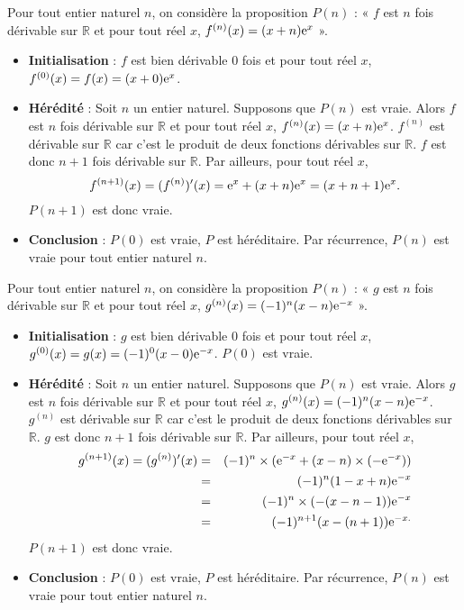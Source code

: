 \documentclass[11pt,fleqn, openany]{book} %
\begin{document}
\begin{solution}Pour tout entier naturel \(n\), on considère la proposition \(P(n)\) : « \(f\) est \(n\) fois dérivable sur \(\mathbb{R}\) et pour tout réel \(x\), \(f^{(n)}(x)=(x+n)\mathrm{e}^x\) ».
\begin{itemize}
\item \textbf{Initialisation} : \(f\) est bien dérivable 0 fois et pour tout réel \(x\), \(f^{(0)}(x)=f(x)=(x+0)\mathrm{e}^x\).
\item\textbf{ Hérédité} : Soit \(n\) un entier naturel. Supposons que \(P(n)\) est vraie. Alors \(f\) est \(n\) fois dérivable sur \(\mathbb{R}\) et pour tout réel \(x\), \(f^{(n)}(x)=(x+n)\mathrm{e}^x\). \(f^{(n)}\) est dérivable sur \(\mathbb{R}\) car c'est le produit de deux fonctions dérivables sur \(\mathbb{R}\). \(f\) est donc \(n+1\) fois dérivable sur \(\mathbb{R}\). Par ailleurs, pour tout réel \(x\),
\[f^{(n+1)}(x) = (f^{(n)})'(x)=\mathrm{e}^x+(x+n)\mathrm{e}^x=(x+n+1)\mathrm{e}^x.\]
\(P(n+1)\) est donc vraie.
\item \textbf{Conclusion} : \(P(0)\) est vraie, \(P\) est héréditaire. Par récurrence, \(P(n)\) est vraie pour tout entier naturel \(n\).
\end{itemize}

Pour tout entier naturel \(n\), on considère la proposition \(P(n)\) : « \(g\) est \(n\) fois dérivable sur \(\mathbb{R}\) et pour tout réel \(x\), \(g^{(n)}(x)=(-1)^n (x-n)\mathrm{e}^{-x}\) ».
\begin{itemize}
\item \textbf{Initialisation} : \(g\) est bien dérivable 0 fois et pour tout réel \(x\), \(g^{(0)}(x)=g(x)=(-1)^0(x-0)\mathrm{e}^{-x}\). \(P(0)\) est vraie.
\item \textbf{Hérédité} : Soit \(n\) un entier naturel. Supposons que \(P(n)\) est vraie. Alors \(g\) est \(n\) fois dérivable sur \(\mathbb{R}\) et pour tout réel \(x\), \(g^{(n)}(x)=(-1)^n(x-n)\mathrm{e}^{-x}\). \(g^{(n)}\) est dérivable sur \(\mathbb{R}\) car c'est le produit de deux fonctions dérivables sur \(\mathbb{R}\). \(g\) est donc \(n+1\) fois dérivable sur \(\mathbb{R}\). Par ailleurs, pour tout réel \(x\),
\begin{eqnarray*}g^{(n+1)}(x) = (g^{(n)})'(x)&=&(-1)^n \times(\mathrm{e}^{-x}+(x-n)\times(-\mathrm{e}^{-x}))\\& =& (-1)^n (1-x+n) \mathrm{e}^{-x} \\&=&(-1)^n \times (-(x-n-1))\mathrm{e}^{-x}\\&=&(-1)^{n+1}(x-(n+1))\mathrm{e}^{-x.}\end{eqnarray*} 
\(P(n+1)\) est donc vraie.
\item \textbf{Conclusion} : \(P(0)\) est vraie, \(P\) est héréditaire. Par récurrence, \(P(n)\) est vraie pour tout entier naturel \(n\).
\end{itemize}
\end{solution}
\end{document}
